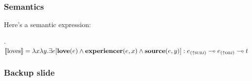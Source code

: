 \documentclass[
11pt,
aspectratio=169, %
]{beamer}
\begin{document}
\begin{frame}
  \frametitle{Semantics}
  Here's a semantic expression:

  \ex.
  $\llbracket \textnormal{loves} \rrbracket = \lambda x \lambda y. \exists e[\mathbf{love}(e) \land \mathbf{experiencer}(e,x) \land \mathbf{source}(e,y)] : e_{(\uparrow \textsc{subj})} \multimap e_{(\uparrow \textsc{obj})} \multimap t$

\end{frame}





\appendix

\begin{frame}
  \frametitle{Backup slide}

\end{frame}
\end{document}
